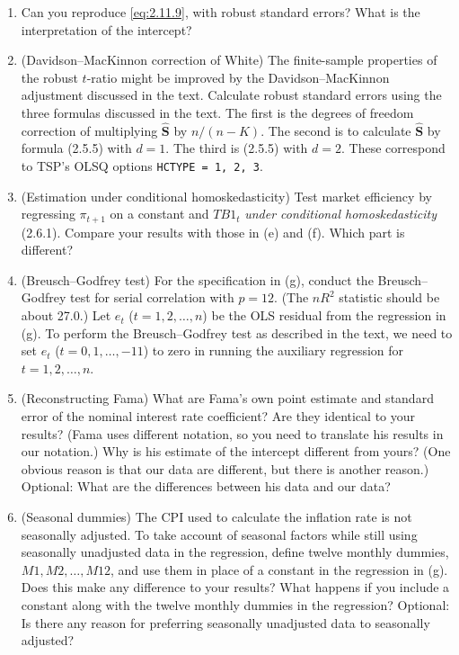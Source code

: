 \begin{problemset}
\begin{enumerate}[label=(\alph*),start=4]
\item Can you reproduce \eqref{eq:2.11.9}, with robust standard errors? What is the
interpretation of the intercept?

\item (Davidson--MacKinnon correction of White)\quad
The finite-sample properties
of the robust $t$-ratio might be improved by the Davidson--MacKinnon adjustment discussed in the text. Calculate robust standard errors using the three
formulas discussed in the text. The first is the degrees of freedom correction of multiplying $\widehat{\mathbf{S}}$ by $n/(n-K)$. The second is to calculate $\widehat{\mathbf{S}}$
by formula (2.5.5) with $d = 1$. The third is (2.5.5) with $d = 2$. These correspond to
TSP's OLSQ options \texttt{HCTYPE = 1, 2, 3}.

\item (Estimation under conditional homoskedasticity)\quad
Test market efficiency
by regressing $\pi_{t+1}$ on a constant and $\mathit{TB1}_t$ \emph{under conditional homoskedasticity} (2.6.1). Compare your results with those in (e) and (f). Which part is
different?

\item (Breusch--Godfrey test)\quad
For the specification in (g), conduct the Breusch--Godfrey test for serial correlation with $p = 12$. (The $nR^2$ statistic should
be about 27.0.) Let $e_t$ ($t = 1, 2, \ldots, n$) be the OLS residual from the
regression in (g). To perform the Breusch--Godfrey test as described in
the text, we need to set $e_t$ ($t = 0, 1, \ldots, -11$) to zero in running the auxiliary
regression for $t = 1, 2, \ldots, n$.

\item (Reconstructing Fama)\quad
What are Fama's own point estimate and standard
error of the nominal interest rate coefficient? Are they identical to your
results? (Fama uses different notation, so you need to translate his results
in our notation.) Why is his estimate of the intercept different from yours?
(One obvious reason is that our data are different, but there is another reason.) Optional: What are the differences between his data and our data?

\item (Seasonal dummies)\quad
The CPI used to calculate the inflation rate is not seasonally adjusted. To take account of seasonal factors while still using seasonally unadjusted data in the regression, define twelve monthly dummies,
$M1, M2, \ldots, M12$, and use them in place of a constant in the regression
in (g). Does this make any difference to your results? What happens if you
include a constant along with the twelve monthly dummies in the regression? Optional: Is there any reason for preferring seasonally unadjusted
data to seasonally adjusted?


\end{enumerate}
\end{problemset}
